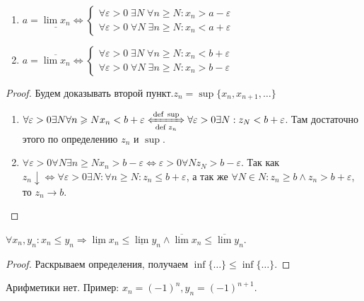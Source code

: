 \begin{theorem}
    \slashn
    \begin{enumerate}
        \item $a = \underline{\lim x_n} \iff
            \begin{cases}
                \forall \varepsilon > 0\; \exists N \; \forall n \ge N: x_n > a - \varepsilon \\
                \forall \varepsilon >0\; \forall N\; \exists n \ge N: x_n < a + \varepsilon
            \end{cases}
            $
        \item $a = \overline{\lim x_n} \iff
            \begin{cases}
                \forall \varepsilon > 0\; \exists N \; \forall n \ge N: x_n < b + \varepsilon \\
                \forall \varepsilon >0\; \forall N\; \exists n \ge N: x_n > b - \varepsilon
            \end{cases} 
            $
    \end{enumerate}
\end{theorem}
\begin{proof}
   Будем доказывать второй пункт.$z_n = \sup \{x_n, x_{n+1}, \ldots\}$
   \begin{enumerate}
       \item $\forall \varepsilon > 0 \exists N \forall n \ge N x_n < b + \varepsilon \xLeftrightarrow[\text{def } z_n]{\text{def } \sup} \forall \varepsilon > 0 \exists N: z_N < b + \varepsilon$. Там достаточно этого по определению $z_n$ и  $\sup$.
       \item  $\forall \varepsilon > 0 \forall N \exists n \ge N x_n > b-\varepsilon \iff \varepsilon > 0 \forall N z_N > b - \varepsilon$. Так как $z_n \downarrow \iff \forall \varepsilon > 0 \exists N: \forall n \ge N: z_n \le b + \varepsilon$, а так же $\forall N \in N: z_n \ge b \land z_n > b + \varepsilon$, то $z_n \to b$.
   \end{enumerate}
\end{proof}
\begin{theorem}
    $\forall x_n, y_n: x_n \le y_n \Rightarrow \underline{\lim} x_n \le \underline{\lim} y_n \land \overline{\lim} x_n \le \overline{\lim} y_n$.
\end{theorem}
\begin{proof}
    Раскрываем определения, получаем $\inf \{\ldots\} \le \inf\{\ldots\}$. 
\end{proof}
\begin{remark}
    Арифметики нет. Пример: $x_n = (-1)^n, y_n = (-1)^{n+1}$.
\end{remark}
